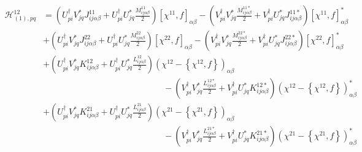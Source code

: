 \documentclass[a4paper,12pt]{book}
\begin{document}
\begin{align*}
\mathcal{H}_{(1),pq}^{12} &= \left(U_{pi}^\dagger V^*_{jq} J_{ij\alpha\beta}^{11} + U_{pi}^\dagger U^*_{jq} \frac{M_{ij\alpha\beta}^{11}}{2} \right)[\chi^{11},f]_{\alpha\beta} -
 \left(V_{pi}^\dagger V^*_{jq} \frac{M_{ij\alpha\beta}^{11*}}{2} + V_{pi}^\dagger U^*_{jq} J_{ij\alpha\beta}^{11*}  \right)[\chi^{11},f]^*_{\alpha\beta} \\
&+ \left(U_{pi}^\dagger V^*_{jq} J_{ij\alpha\beta}^{22} + U_{pi}^\dagger U^*_{jq} \frac{M_{ij\alpha\beta}^{22}}{2} \right)[\chi^{22},f]_{\alpha\beta} -
 \left(V_{pi}^\dagger V^*_{jq} \frac{M_{ij\alpha\beta}^{22*}}{2} + V_{pi}^\dagger U^*_{jq} J_{ij\alpha\beta}^{22*}  \right)[\chi^{22},f]^*_{\alpha\beta} \\
&+ \left(U_{pi}^\dagger V^*_{jq} K_{ij\alpha\beta}^{12} + U_{pi}^\dagger U^*_{jq} \frac{L_{ij\alpha\beta}^{12}}{2} \right)\left(\chi^{12}-\left\{\chi^{12},f\right\}\right)_{\alpha\beta} \\ &\qquad\qquad\qquad\qquad\qquad\qquad\qquad-
 \left(V_{pi}^\dagger V^*_{jq} \frac{L_{ij\alpha\beta}^{12*}}{2} + V_{pi}^\dagger U^*_{jq} K_{ij\alpha\beta}^{12*}  \right)\left(\chi^{12}-\left\{\chi^{12},f\right\}\right)^*_{\alpha\beta} \\
&+ \left(U_{pi}^\dagger V^*_{jq} K_{ij\alpha\beta}^{21} + U_{pi}^\dagger U^*_{jq} \frac{L_{ij\alpha\beta}^{21}}{2} \right)\left(\chi^{21}-\left\{\chi^{21},f\right\}\right)_{\alpha\beta} \\ &\qquad\qquad\qquad\qquad\qquad\qquad\qquad-
 \left(V_{pi}^\dagger V^*_{jq} \frac{L_{ij\alpha\beta}^{21*}}{2} + V_{pi}^\dagger U^*_{jq} K_{ij\alpha\beta}^{21*}  \right)\left(\chi^{21}-\left\{\chi^{21},f\right\}\right)^*_{\alpha\beta}
\end{align*}
\end{document}
